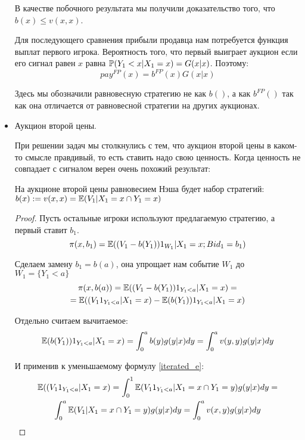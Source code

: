 \begin{itemize}
В качестве побочного результата мы получили доказательство того, что $ b(x)\leq v(x,x) $.

Для последующего сравнения прибыли продавца нам потребуется функция выплат первого игрока. Вероятность того, что первый выиграет аукцион если его сигнал равен $ x $ равна $ \P(Y_{1}<x|X_{1}=x)=G(x|x)$. Поэтому:
\begin{equation}
pay^{FP}(x)=b^{FP}(x)G(x|x)
\end{equation}

Здесь мы обозначили равновесную стратегию не как $ b() $, а как $ b^{FP}() $ так как она отличается от равновесной стратегии на других аукционах.

\item Аукцион второй цены.

При решении задач мы столкнулись с тем, что аукцион второй цены в каком-то смысле правдивый, то есть ставить надо свою ценность. Когда ценность не совпадает с сигналом верен очень похожий результат:

\begin{myth} \label{NE_SP}
На аукционе второй цены равновесием Нэша будет набор стратегий: $ b(x):=v(x,x)=\E(V_{1}|X_{1}=x \cap Y_{1}=x) $
\end{myth}
\begin{proof}
Пусть остальные игроки используют предлагаемую стратегию, а первый ставит $ b_{1} $.
\begin{equation}
\pi(x,b_{1})=\E((V_{1}-b(Y_{1}))1_{W_{1}}|X_{1}=x; Bid_{1}=b_{1})
\end{equation}

Сделаем замену $ b_{1}=b(a) $, она упрощает нам событие $ W_{1} $ до $ W_{1}=\{Y_{1}<a\} $
\begin{multline}
\pi(x,b(a))=\E((V_{1}-b(Y_{1}))1_{Y_{1}<a}|X_{1}=x)=\\
=\E((V_{1}1_{Y_{1}<a}|X_{1}=x)-\E(b(Y_{1}))1_{Y_{1}<a}|X_{1}=x)
\end{multline}

Отдельно считаем вычитаемое:
\begin{equation}
\E(b(Y_{1}))1_{Y_{1}<a}|X_{1}=x)=\int_{0}^{a}b(y)g(y|x)dy=\int_{0}^{a}v(y,y)g(y|x)dy
\end{equation}

И применив к уменьшаемому формулу \ref{iterated_e}:
\begin{multline}
\E((V_{1}1_{Y_{1}<a}|X_{1}=x)=\int_{0}^{1}\E(V_{1}1_{Y_{1}<a}|X_{1}=x \cap Y_{1}=y)g(y|x)dy=\\
\int_{0}^{a}\E(V_{1}|X_{1}=x \cap Y_{1}=y)g(y|x)dy=\int_{0}^{a}v(x,y)g(y|x)dy
\end{multline}



\end{proof}
\end{itemize}
